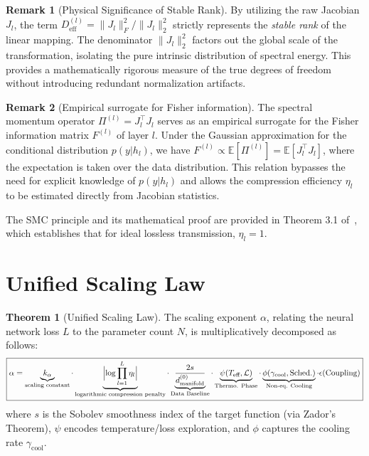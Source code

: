 \documentclass[11pt, a4paper]{article}
\theoremstyle{definition}
\newtheorem{theorem}{Theorem}[section]
\newtheorem{remark}{Remark}[section]
\begin{document}
\begin{remark}[Physical Significance of Stable Rank]
\label{rem:stable-rank}
By utilizing the raw Jacobian $J_l$, the term $D_{\text{eff}}^{(l)} = \|J_l\|_F^2 / \|J_l\|_2^2$ strictly represents the \textit{stable rank} of the linear mapping. The denominator $\|J_l\|_2^2$ factors out the global scale of the transformation, isolating the pure intrinsic distribution of spectral energy. This provides a mathematically rigorous measure of the true degrees of freedom without introducing redundant normalization artifacts.
\end{remark}

\begin{remark}[Empirical surrogate for Fisher information]
The spectral momentum operator $\Pi^{(l)} = J_l^\top J_l$ serves as an empirical surrogate for the Fisher information matrix $F^{(l)}$ of layer $l$. Under the Gaussian approximation for the conditional distribution $p(y|h_l)$, we have $F^{(l)} \propto \mathbb{E}[\Pi^{(l)}] = \mathbb{E}[J_l^\top J_l]$, where the expectation is taken over the data distribution. This relation bypasses the need for explicit knowledge of $p(y|h_l)$ and allows the compression efficiency $\eta_l$ to be estimated directly from Jacobian statistics.
\end{remark}

The SMC principle and its mathematical proof are provided in Theorem 3.1 of~\cite{liu2024unified}, which establishes that for ideal lossless transmission, $\eta_l = 1$.

\section{Unified Scaling Law}
\label{sec:unified-scaling}

\begin{theorem}[Unified Scaling Law]
\label{thm:unified-scaling}
The scaling exponent $\alpha$, relating the neural network loss $L$ to the parameter count $N$, is multiplicatively decomposed as follows:
\begin{equation}
\boxed{
\alpha = \underbrace{k_\alpha}_{\text{scaling constant}} \cdot \underbrace{\Bigl|\log\prod_{l=1}^L \eta_l\Bigr|}_{\text{logarithmic compression penalty}} \cdot \underbrace{\frac{2s}{d_{\text{manifold}}^{(0)}}}_{\text{Data Baseline}} \cdot \underbrace{\psi(T_{\text{eff}}, \mathcal{L})}_{\text{Thermo. Phase}} \cdot \underbrace{\phi(\gamma_{\text{cool}}, \text{Sched.})}_{\text{Non-eq. Cooling}} \cdot \epsilon(\text{Coupling})
}
\end{equation}
where $s$ is the Sobolev smoothness index of the target function (via Zador's Theorem), $\psi$ encodes temperature/loss exploration, and $\phi$ captures the cooling rate $\gamma_{\text{cool}}$.
\end{theorem}
\end{document}
